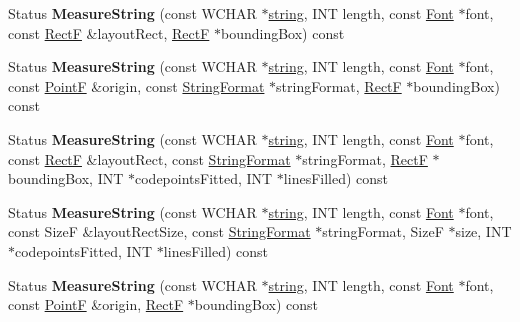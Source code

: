 \begin{DoxyCompactItemize}
\item 
\mbox{\label{class_graphics_a7b8f0247b626bd925fd2322d53e1b9d2}} 
Status {\bfseries Measure\+String} (const W\+C\+H\+AR $\ast$\hyperlink{structstring}{string}, I\+NT length, const \hyperlink{class_font}{Font} $\ast$font, const \hyperlink{struct_rect_f}{RectF} \&layout\+Rect, \hyperlink{struct_rect_f}{RectF} $\ast$bounding\+Box) const
\item 
\mbox{\label{class_graphics_ac0608086a5b97ea4773f00b948dcb942}} 
Status {\bfseries Measure\+String} (const W\+C\+H\+AR $\ast$\hyperlink{structstring}{string}, I\+NT length, const \hyperlink{class_font}{Font} $\ast$font, const \hyperlink{struct_point_f}{PointF} \&origin, const \hyperlink{class_string_format}{String\+Format} $\ast$string\+Format, \hyperlink{struct_rect_f}{RectF} $\ast$bounding\+Box) const
\item 
\mbox{\label{class_graphics_aa92392823e1645651cd652ac3f4bc2d5}} 
Status {\bfseries Measure\+String} (const W\+C\+H\+AR $\ast$\hyperlink{structstring}{string}, I\+NT length, const \hyperlink{class_font}{Font} $\ast$font, const \hyperlink{struct_rect_f}{RectF} \&layout\+Rect, const \hyperlink{class_string_format}{String\+Format} $\ast$string\+Format, \hyperlink{struct_rect_f}{RectF} $\ast$bounding\+Box, I\+NT $\ast$codepoints\+Fitted, I\+NT $\ast$lines\+Filled) const
\item 
\mbox{\label{class_graphics_a84cdcc1bb03355c178363af89521479c}} 
Status {\bfseries Measure\+String} (const W\+C\+H\+AR $\ast$\hyperlink{structstring}{string}, I\+NT length, const \hyperlink{class_font}{Font} $\ast$font, const SizeF \&layout\+Rect\+Size, const \hyperlink{class_string_format}{String\+Format} $\ast$string\+Format, SizeF $\ast$size, I\+NT $\ast$codepoints\+Fitted, I\+NT $\ast$lines\+Filled) const
\item 
\mbox{\label{class_graphics_a7b7b14f84daed5093a635683610d229b}} 
Status {\bfseries Measure\+String} (const W\+C\+H\+AR $\ast$\hyperlink{structstring}{string}, I\+NT length, const \hyperlink{class_font}{Font} $\ast$font, const \hyperlink{struct_point_f}{PointF} \&origin, \hyperlink{struct_rect_f}{RectF} $\ast$bounding\+Box) const
\item 
\mbox{\label{class_graphics_a1d7d6e00b16420e964da6c4d4dc8da0b}} 

\end{DoxyCompactItemize}
